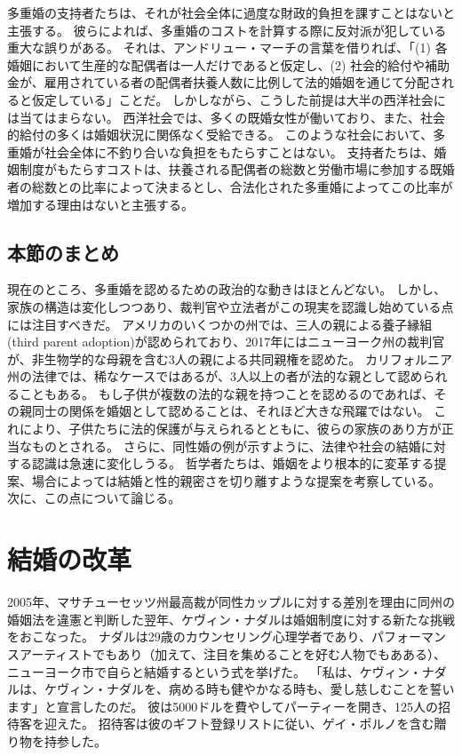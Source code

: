 \documentclass[paper=a4,book,openany]{jlreq}
\begin{document}
多重婚の支持者たちは、それが社会全体に過度な財政的負担を課すことはないと主張する。
彼らによれば、多重婚のコストを計算する際に反対派が犯している重大な誤りがある。
それは、アンドリュー・マーチの言葉を借りれば、「(1) 各婚姻において生産的な配偶者は一人だけであると仮定し、(2) 社会的給付や補助金が、雇用されている者の配偶者扶養人数に比例して法的婚姻を通じて分配されると仮定している」ことだ\citep[p.268]{march11:_is_there_right_polyg}。
しかしながら、こうした前提は大半の西洋社会には当てはまらない。
西洋社会では、多くの既婚女性が働いており、また、社会的給付の多くは婚姻状況に関係なく受給できる。
このような社会において、多重婚が社会全体に不釣り合いな負担をもたらすことはない。
支持者たちは、婚姻制度がもたらすコストは、扶養される配偶者の総数と労働市場に参加する既婚者の総数との比率によって決まるとし、合法化された多重婚によってこの比率が増加する理由はないと主張する。

\subsection{本節のまとめ}

現在のところ、多重婚を認めるための政治的な動きはほとんどない。
しかし、家族の構造は変化しつつあり、裁判官や立法者がこの現実を認識し始めている点には注目すべきだ。
アメリカのいくつかの州では、三人の親による養子縁組(third parent adoption)が認められており、2017年にはニューヨーク州の裁判官が、非生物学的な母親を含む3人の親による共同親権を認めた。
カリフォルニア州の法律では、稀なケースではあるが、3人以上の者が法的な親として認められることもある。
もし子供が複数の法的な親を持つことを認めるのであれば、その親同士の関係を婚姻として認めることは、それほど大きな飛躍ではない。
これにより、子供たちに法的保護が与えられるとともに、彼らの家族のあり方が正当なものとされる。
さらに、同性婚の例が示すように、法律や社会の結婚に対する認識は急速に変化しうる。
哲学者たちは、婚姻をより根本的に変革する提案、場合によっては結婚と性的親密さを切り離すような提案を考察している。
次に、この点について論じる。

\section{結婚の改革}

2005年、マサチューセッツ州最高裁が同性カップルに対する差別を理由に同州の婚姻法を違憲と判断した翌年、ケヴィン・ナダルは婚姻制度に対する新たな挑戦をおこなった。
ナダルは29歳のカウンセリング心理学者であり、パフォーマンスアーティストでもあり（加えて、注目を集めることを好む人物でもあある）、ニューヨーク市で自らと結婚するという式を挙げた。
「私は、ケヴィン・ナダルは、ケヴィン・ナダルを、病める時も健やかなる時も、愛し慈しむことを誓います」と宣言したのだ。
彼は5000ドルを費やしてパーティーを開き、125人の招待客を迎えた。
招待客は彼のギフト登録リストに従い、ゲイ・ポルノを含む贈り物を持参した\citep{krum05:_man_who_married_himsel}。
\end{document}
